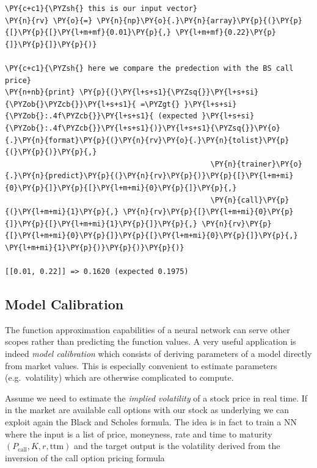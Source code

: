 \begin{tcolorbox}[breakable, size=fbox, boxrule=1pt, pad at break*=1mm,colback=cellbackground, colframe=cellborder]
\begin{Verbatim}[commandchars=\\\{\}]
\PY{c+c1}{\PYZsh{} this is our input vector}
\PY{n}{rv} \PY{o}{=} \PY{n}{np}\PY{o}{.}\PY{n}{array}\PY{p}{(}\PY{p}{[}\PY{p}{[}\PY{l+m+mf}{0.01}\PY{p}{,} \PY{l+m+mf}{0.22}\PY{p}{]}\PY{p}{]}\PY{p}{)}
	
\PY{c+c1}{\PYZsh{} here we compare the predection with the BS call price}
\PY{n+nb}{print} \PY{p}{(}\PY{l+s+s1}{\PYZsq{}}\PY{l+s+si}{\PYZob{}\PYZcb{}}\PY{l+s+s1}{ =\PYZgt{} }\PY{l+s+si}{\PYZob{}:.4f\PYZcb{}}\PY{l+s+s1}{ (expected }\PY{l+s+si}{\PYZob{}:.4f\PYZcb{}}\PY{l+s+s1}{)}\PY{l+s+s1}{\PYZsq{}}\PY{o}{.}\PY{n}{format}\PY{p}{(}\PY{n}{rv}\PY{o}{.}\PY{n}{tolist}\PY{p}{(}\PY{p}{)}\PY{p}{,} 
                                               \PY{n}{trainer}\PY{o}{.}\PY{n}{predict}\PY{p}{(}\PY{n}{rv}\PY{p}{)}\PY{p}{[}\PY{l+m+mi}{0}\PY{p}{]}\PY{p}{[}\PY{l+m+mi}{0}\PY{p}{]}\PY{p}{,} 
                                               \PY{n}{call}\PY{p}{(}\PY{l+m+mi}{1}\PY{p}{,} \PY{n}{rv}\PY{p}{[}\PY{l+m+mi}{0}\PY{p}{]}\PY{p}{[}\PY{l+m+mi}{1}\PY{p}{]}\PY{p}{,} \PY{n}{rv}\PY{p}{[}\PY{l+m+mi}{0}\PY{p}{]}\PY{p}{[}\PY{l+m+mi}{0}\PY{p}{]}\PY{p}{,} \PY{l+m+mi}{1}\PY{p}{)}\PY{p}{)}\PY{p}{)}

[[0.01, 0.22]] => 0.1620 (expected 0.1975)
\end{Verbatim}
\end{tcolorbox}

\subsection{Model Calibration}\label{model-calibration}

The function approximation capabilities of a neural network can serve
other scopes rather than predicting the function values. A very useful
application is indeed \emph{model calibration} which consists of
deriving parameters of a model directly from market values. This is
especially convenient to estimate parameters (e.g.~volatility) which are
otherwise complicated to compute.

Assume we need to estimate the \emph{implied volatility} of a stock price
in real time. If in the market are available call options with our stock
as underlying we can exploit again the Black and Scholes formula. The
idea is in fact to train a NN where the input is a list of price,
moneyness, rate and time to maturity
\((P_\textrm{call}, K, r, \mathrm{ttm})\) and the target output is the
volatility derived from the inversion of the call option pricing formula

